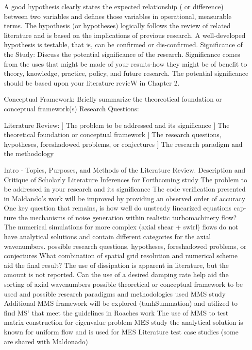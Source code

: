 \documentclass[a4paper]{report}
\begin{document}
\begin{outline}[enumerate]
    A good hypothesis clearly states the expected relationship ( or difference) 
    between two variables and defines those variables in operational, measurable 
    terms. The hypothesis (or hypotheses) logically follows the review of related 
    literature and is based on the implications of previous research. A 
    well-developed hypothesis is testable, that is, can be confirmed or 
    dis-confirmed. 
    \1[1-D.2] Significance of the Study: Discuss the potential significance of
    the research. Significance comes from the uses that might be made of your
    results-how they might be of benefit to theory, knowledge, practice, policy,
    and future research. The potential significance should be based upon your
    literature revieW in Chapter 2. 

    \1[1-E.] Conceptual Framework: Briefly summarize the theoreotical foundation 
    or conceptual framework(s) 
    \2 Research Questions:

    \1 Literature Review:
    \1[a]] The problem to be addressed and its significance
    \1[b]] The theoretical foundation or conceptual framework
    \1[c]] The research questions, hypotheses, foreshadowed problems, or conjectures
    \1[d]] The research paradigm and the methodology

    \2 Intro - Topics, Purposes, and Methods of the Literature Review.
    \2 Description and Critique of Scholarly Literature
    \2 Inferences for Forthcoming study
    \3 The problem to be addressed in your research and its significance
    \4 The code verification presented in Maldando's work will be 
    improved by providing an observed order of accuracy
    \4 One key question that remains, is how well do unsteady linearized equations cap-
    ture the mechanisms of noise generation within realistic 
    turbomachinery flow? The numerical simulations for more complex 
    (axial shear + swirl) flows do not have analytical solutions and contain 
    different categories for the axial wavenumbers.  
    \3 possible research questions, hypotheses, foreshadowed problems, or 
    conjectures
    \4 What combination of spatial grid resolution and numerical scheme aid 
    the final result? The use of dissipation is apparent in literature, but the
    amount is not reported. 
    \4 Can the use of a desired damping rate help aid the sorting of axial wavenumbers
    \3 possible theoretical or conceptual framework to be used and
     possible research paradigms and methodologies used
    \4 MMS study 
    \4[-] Additional MMS framework will be explored (tanhSummation) and utilized
    to find MS' that meet the guidelines in Roaches work 
    \4[-] The use of MMS to test matrix construction for eigenvalue problem 
    \4 MES study
    \4[-] the analytical solution is known for uniform flow and is used for
    MES
   \4 Literature test case studies (some are shared with Maldonado)


\end{outline}
\end{document}
